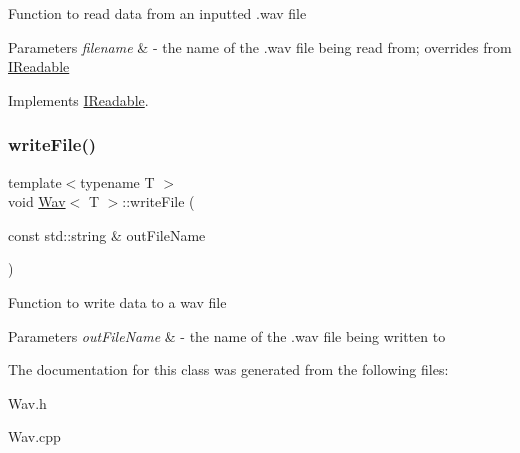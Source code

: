 Function to read data from an inputted .wav file 
\begin{DoxyParams}{Parameters}
{\em filename} & -\/ the name of the .wav file being read from; overrides from \hyperlink{classIReadable}{I\+Readable} \\
\hline
\end{DoxyParams}


Implements \hyperlink{classIReadable}{I\+Readable}.

\mbox{\label{classWav_afbae07371a8e0f17cc8e3a29507016e3}} 
\subsubsection{\texorpdfstring{write\+File()}{writeFile()}}
{\footnotesize\ttfamily template$<$typename T $>$ \\
void \hyperlink{classWav}{Wav}$<$ T $>$\+::write\+File (\begin{DoxyParamCaption}\item[{const std\+::string \&}]{out\+File\+Name }\end{DoxyParamCaption})}

Function to write data to a wav file 
\begin{DoxyParams}{Parameters}
{\em out\+File\+Name} & -\/ the name of the .wav file being written to \\
\hline
\end{DoxyParams}


The documentation for this class was generated from the following files\+:\begin{DoxyCompactItemize}
\item 
Wav.\+h\item 
Wav.\+cpp\end{DoxyCompactItemize}
